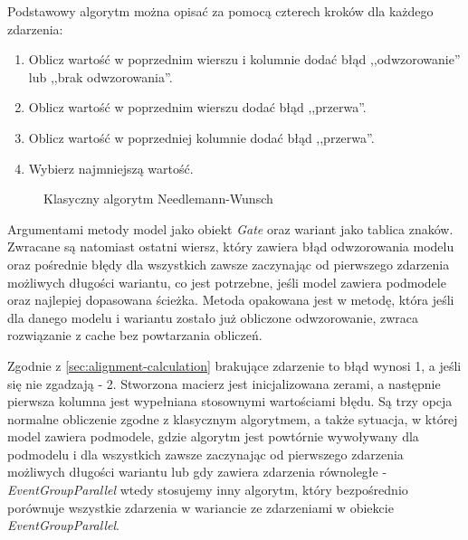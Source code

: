 Podstawowy algorytm można opisać za pomocą czterech kroków dla każdego zdarzenia:  
\begin{enumerate}
  \item Oblicz wartość w poprzednim wierszu i kolumnie dodać błąd ,,odwzorowanie'' lub ,,brak odwzorowania''.
  \item Oblicz wartość w poprzednim wierszu dodać błąd ,,przerwa''.
  \item Oblicz wartość w poprzedniej kolumnie dodać błąd ,,przerwa''.
  \item Wybierz najmniejszą wartość.
\end{enumerate}

\begin{figure}[h]
	\caption{\label{fig:algo_example}Klasyczny algorytm Needlemann-Wunsch}
\end{figure}


Argumentami metody model jako obiekt \textit{Gate} oraz wariant jako tablica znaków. Zwracane są natomiast ostatni wiersz, który zawiera błąd odwzorowania modelu oraz pośrednie błędy dla wszystkich zawsze zaczynając od pierwszego zdarzenia możliwych długości wariantu, co jest potrzebne, jeśli model zawiera podmodele oraz najlepiej dopasowana ścieżka. Metoda opakowana jest w metodę, która jeśli dla danego modelu i wariantu zostało już obliczone odwzorowanie, zwraca rozwiązanie z cache bez powtarzania obliczeń.

Zgodnie z \ref{sec:alignment-calculation} brakujące zdarzenie to błąd wynosi 1, a jeśli się nie zgadzają - 2. Stworzona macierz jest inicjalizowana zerami, a następnie pierwsza kolumna jest wypełniana stosownymi wartościami błędu. Są trzy opcja normalne obliczenie zgodne z klasycznym algorytmem, a także sytuacja, w której model zawiera podmodele, gdzie algorytm jest powtórnie wywoływany dla podmodelu i dla wszystkich zawsze zaczynając od pierwszego zdarzenia możliwych długości wariantu lub gdy zawiera zdarzenia równoległe - \textit{EventGroupParallel} wtedy stosujemy inny algorytm, który bezpośrednio porównuje wszystkie zdarzenia w wariancie ze zdarzeniami w obiekcie \textit{EventGroupParallel}. 
     

